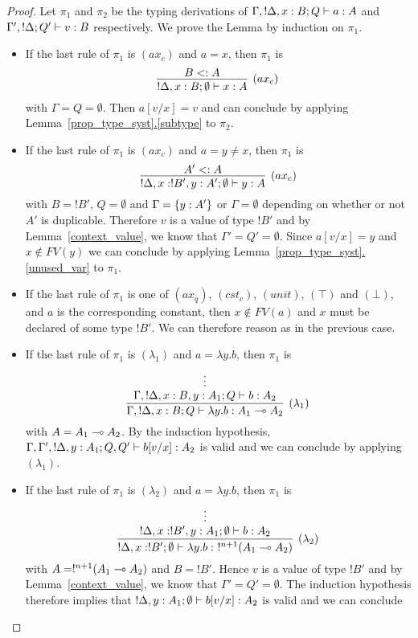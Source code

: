 \documentclass{article}
\begin{document}
\begin{proof}
Let $\pi_1$ and $\pi_2$ be the typing derivations  of 
$\Gamma,!\Delta,x:B;Q \vdash a:A$ and  $\Gamma',!\Delta;Q' \vdash v:B$ 
respectively. We prove the Lemma by induction on $\pi_1$.
\begin{itemize}
 \item If the last rule of $\pi_1$ is $(ax_c)$ and $a=x$, then $\pi_1$ is
 \[
   \infer[(ax_c)]{!\Delta, x:B;\emptyset\entails x:A}{
     B<:A
   }
 \]
 with $\Gamma=Q=\emptyset$. Then $a[v/x]=v$ and can conclude by applying 
 Lemma~\hyperref[subtype]{\ref*{prop_type_syst}.\ref*{subtype}} to $\pi_2$.
 \item If the last rule of $\pi_1$ is $(ax_c)$ and $a=y\neq x$, then 
 $\pi_1$ is
 \[
   \infer[(ax_c)]{!\Delta, x:!B',y:A';\emptyset\entails y:A}{
     A'<:A
   }
 \]
 with $B=!B'$, $Q=\emptyset$ and $\Gamma =\{y:A'\}$ or $\Gamma=\emptyset$ 
 depending on whether or not $A'$ is duplicable. Therefore $v$ is a value of 
 type $!B'$ and by Lemma~\hyperref[context_value]{\ref*{context_value}}, 
 we know that $\Gamma'=Q'=\emptyset$. Since $a[v/x]=y$ and $x\notin FV(y)$ 
 we can conclude by applying
 Lemma~\hyperref[unused_var]{\ref*{prop_type_syst}.\ref*{unused_var}} to $\pi_1$.
 \item If the last rule of $\pi_1$ is one of $(ax_q)$, $(cst_c)$, 
 $(unit)$, $(\top)$ and $(\bot)$, and $a$ is the corresponding constant, 
 then $x\notin FV(a)$ and  $x$ must be declared of some type $!B'$.
 We can therefore reason as in the previous case. 
 \item If the last rule of $\pi_1$ is $(\lambda_1)$ and $a=\lambda y.b$, then $\pi_1$ is
  \[
   \infer[(\lambda_1)]{\Gamma,!\Delta,x:B;Q\entails \lambda y.b:A_1\loli A_2}{
     \deduce[]{\Gamma, !\Delta,x:B,y:A_1;Q \entails b:A_2}{
       \vdots
     }
   }
 \]
 with $A=A_1\multimap A_2$. By the induction hypothesis, 
 $\Gamma, \Gamma',!\Delta,y:A_1;Q,Q' \vdash b[v/x]:A_2$ is valid and we can conclude
 by applying $(\lambda_1)$.
 \item If the last rule of $\pi_1$ is $(\lambda_2)$ and $a=\lambda y.b$, 
 then $\pi_1$ is
 \[
  \infer[(\lambda_2)]{!\Delta, x:!B';\emptyset \entails \lambda y.b:~!^{n+1}(A_1\loli A_2)}{
    \deduce[]{!\Delta, x:!B',y:A_1;\emptyset \entails b:A_2}{
      \vdots
    }
  }
 \]
 with $A=!^{n+1}(A_1\multimap A_2)$ and $B=!B'$. Hence $v$ is a value of type $!B'$ and  
 by Lemma~\hyperref[context_value]{\ref*{context_value}}, we know that
 $\Gamma'=Q'=\emptyset$. The induction hypothesis therefore implies that
 $!\Delta,y:A_1;\emptyset \vdash b[v/x]:A_2$ is valid and we can conclude

\end{itemize}
\end{proof}
\end{document}
